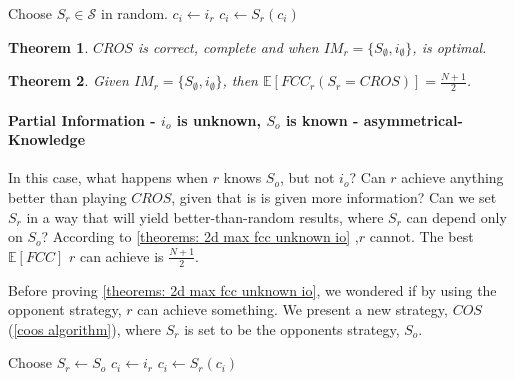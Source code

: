 \documentclass[a4paper,english,10pt]{article}
\newtheorem{theorem}{Theorem}[section]
\newcommand\rob{\ensuremath{r}\xspace}
\newcommand\opp{\ensuremath{o}\xspace}
\newcommand{\fcc}{\ensuremath{FCC}\xspace}
\newcommand{\cros}{\ensuremath{CROS}\xspace}
\newcommand{\coos}{\ensuremath{COS}\xspace}
\begin{document}
\begin{algorithm}
\begin{algorithmic}
	\STATE Choose $S_\rob \in \mathcal{S}$ in random.
    \STATE $c_i \leftarrow i_\rob$
    \LOOP
    	\STATE $c_i \leftarrow S_\rob(c_i)$
    \ENDLOOP
  
\end{algorithmic}
\caption{\cros\label{algorithms: cros}}
\end{algorithm}

\begin{theorem} \label{theorems: cros correctness and optimalty}
\cros is correct, complete and when $IM_\rob=\lbrace S_\emptyset, i_\emptyset \rbrace$, is optimal.
\end{theorem}

\begin{theorem} \label{cross efcc}
Given $IM_\rob=\lbrace S_\emptyset, i_\emptyset \rbrace$, then $\mathbb{E}[\fcc_\rob(S_\rob=\cros)]=\frac{N+1}{2}$.
\end{theorem}


\paragraph{Partial Information - $i_\opp$ is unknown, $S_\opp$ is known - asymmetrical-Knowledge} 


In this case, what happens when \rob knows $S_\opp$, but not $i_\opp$? Can \rob achieve anything better than playing \cros, given that is is given more information? Can we set $S_\rob$ in a way that will yield better-than-random results, where $S_\rob$ can depend only on $S_\opp$? According to \ref{theorems: 2d max fcc unknown io} ,\rob cannot. The best $\mathbb{E}[\fcc]$ \rob can achieve is $\frac{N+1}{2}$.

Before proving \ref{theorems: 2d max fcc unknown io}, we wondered if by using the opponent strategy, \rob can achieve something. We present a new strategy, \coos(\ref{coos algorithm}), where $S_\rob$ is set to be the opponents strategy, $S_\opp$. 
\begin{algorithm}
\begin{algorithmic}
	\STATE Choose $S_\rob \leftarrow S_\opp$
    \STATE $c_i \leftarrow i_\rob$
    \LOOP
    	\STATE $c_i \leftarrow S_\rob(c_i)$
    \ENDLOOP
  
\end{algorithmic}
\caption{\coos\label{coos algorithm}}
\end{algorithm}
\end{document}
